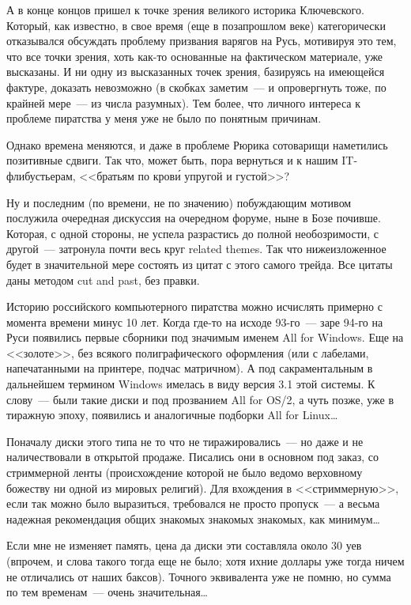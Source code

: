 А в конце концов пришел к точке зрения великого историка Ключевского. Который, как известно, в свое время (еще в позапрошлом веке) категорически отказывался обсуждать проблему призвания варягов на Русь, мотивируя это тем, что все точки зрения, хоть как-то основанные на фактическом материале, уже высказаны. И ни одну из высказанных точек зрения, базируясь на имеющейся фактуре, доказать невозможно (в скобках заметим~--- и опровергнуть тоже, по крайней мере~--- из числа разумных). Тем более, что личного интереса к проблеме пиратства у меня уже не было по понятным причинам.

Однако времена меняются, и даже в проблеме Рюрика сотоварищи наметились позитивные сдвиги. Так что, может быть, пора вернуться и к нашим IT-флибустьерам, <<братьям по кров\'{и} упругой и густой>>?

Ну и последним (по времени, не по значению) побуждающим мотивом послужила очередная дискуссия на очередном форуме, ныне в Бозе почивше. Которая, с одной стороны, не успела разрастись до полной необозримости, с другой~--- затронула почти весь круг related themes. Так что нижеизложенное будет в значительной мере состоять из цитат с этого самого трейда. Все цитаты даны методом cut and past, без правки.

Историю российского компьютерного пиратства можно исчислять примерно с момента времени минус 10 лет. Когда где-то на исходе 93-го~--- заре 94-го на Руси появились первые сборники под значимым именем All for Windows. Еще на <<золоте>>, без всякого полиграфического оформления (или с лабелами, напечатанными на принтере, подчас матричном). А под сакраментальным в дальнейшем термином Windows имелась в виду версия 3.1 этой системы. К слову~--- были такие диски и под прозванием All for OS/2, а чуть позже, уже в тиражную эпоху, появились и аналогичные подборки All for Linux\dots

Поначалу диски этого типа не то что не тиражировались~--- но даже и не наличествовали в открытой продаже. Писались они в основном под заказ, со стриммерной ленты (происхождение которой не было ведомо верховному божеству ни одной из мировых религий). Для вхождения в <<стриммерную>>, если так можно было выразиться, требовался не просто пропуск~--- а весьма надежная рекомендация общих знакомых знакомых знакомых, как минимум\dots

Если мне не изменяет память, цена да диски эти составляла около 30 уев (впрочем, и слова такого тогда еще не было; хотя ихние доллары уже тогда ничем не отличались от наших баксов). Точного эквивалента уже не помню, но сумма по тем временам~--- очень значительная\dots

